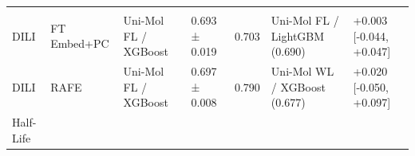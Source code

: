 \documentclass[
  10pt,
]{article}
\begin{document}
\begin{longtable}[]{@{}lllllll@{}}
\begin{minipage}[t]{0.12\columnwidth}
\end{minipage}\tabularnewline
\begin{minipage}[t]{0.12\columnwidth}\raggedright
DILI\strut
\end{minipage} & \begin{minipage}[t]{0.12\columnwidth}\raggedright
FT Embed+PC\strut
\end{minipage} & \begin{minipage}[t]{0.12\columnwidth}\raggedright
Uni-Mol FL / XGBoost\strut
\end{minipage} & \begin{minipage}[t]{0.12\columnwidth}\raggedright
0.693 ± 0.019\strut
\end{minipage} & \begin{minipage}[t]{0.12\columnwidth}\raggedright
0.703\strut
\end{minipage} & \begin{minipage}[t]{0.12\columnwidth}\raggedright
Uni-Mol FL / LightGBM (0.690)\strut
\end{minipage} & \begin{minipage}[t]{0.12\columnwidth}\raggedright
+0.003 {[}-0.044, +0.047{]}\strut
\end{minipage}\tabularnewline
\begin{minipage}[t]{0.12\columnwidth}\raggedright
DILI\strut
\end{minipage} & \begin{minipage}[t]{0.12\columnwidth}\raggedright
RAFE\strut
\end{minipage} & \begin{minipage}[t]{0.12\columnwidth}\raggedright
Uni-Mol FL / XGBoost\strut
\end{minipage} & \begin{minipage}[t]{0.12\columnwidth}\raggedright
0.697 ± 0.008\strut
\end{minipage} & \begin{minipage}[t]{0.12\columnwidth}\raggedright
0.790\strut
\end{minipage} & \begin{minipage}[t]{0.12\columnwidth}\raggedright
Uni-Mol WL / XGBoost (0.677)\strut
\end{minipage} & \begin{minipage}[t]{0.12\columnwidth}\raggedright
+0.020 {[}-0.050, +0.097{]}\strut
\end{minipage}\tabularnewline
\begin{minipage}[t]{0.12\columnwidth}\raggedright
Half-Life\strut
\end{minipage} & \begin{minipage}[t]{0.12\columnwidth}\raggedright

\end{minipage}
\end{longtable}
\end{document}
